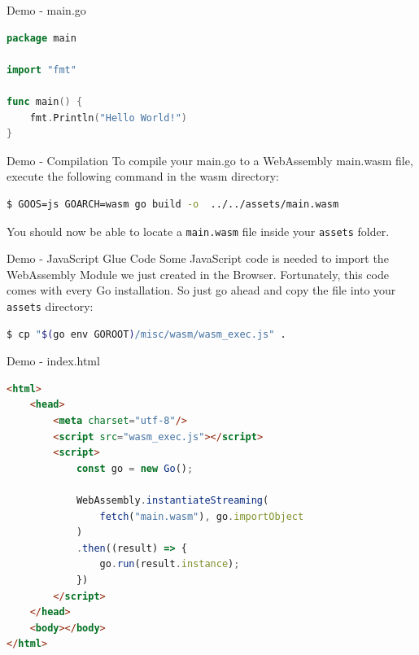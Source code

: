 \documentclass{beamer}
\begin{document}
\begin{frame}[fragile]{Demo - main.go}
    \begin{lstlisting}[language=Go,basicstyle=\scriptsize]
package main

import "fmt"

func main() {
	fmt.Println("Hello World!")
}

    \end{lstlisting}
\end{frame}

\begin{frame}[fragile]{Demo - Compilation}
    To compile your main.go to a WebAssembly main.wasm file, execute the following command in the wasm directory:

    \begin{lstlisting}[language=Bash,basicstyle=\scriptsize]
$ GOOS=js GOARCH=wasm go build -o  ../../assets/main.wasm
    \end{lstlisting}

    You should now be able to locate a \lstinline{main.wasm} file inside your \lstinline{assets} folder.
\end{frame}

\begin{frame}[fragile]{Demo - JavaScript Glue Code}
    Some JavaScript code is needed to import the WebAssembly Module we just created in the Browser. Fortunately, this code comes with every Go installation. So just go ahead and copy the file into your \lstinline{assets} directory:

    \begin{lstlisting}[language=Bash,basicstyle=\scriptsize]
$ cp "$(go env GOROOT)/misc/wasm/wasm_exec.js" .
\end{lstlisting}
\end{frame}

\begin{frame}[fragile]{Demo - index.html}
    \begin{lstlisting}[language=html,basicstyle=\scriptsize]
<html>
    <head>
        <meta charset="utf-8"/>
        <script src="wasm_exec.js"></script>
        <script>
            const go = new Go();

            WebAssembly.instantiateStreaming(
                fetch("main.wasm"), go.importObject
            )
            .then((result) => {
                go.run(result.instance);
            })
        </script>
    </head>
    <body></body>
</html>
\end{lstlisting}
\end{frame}
\end{document}
